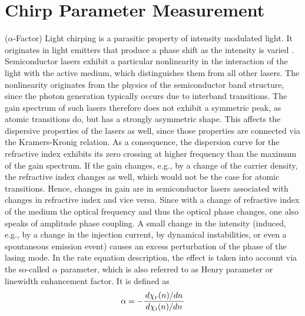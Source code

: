 \section{Chirp Parameter Measurement}\label{sec:chirp_measurement}
($\alpha$-Factor)
Light chirping is a parasitic property of intensity modulated light. It originates in light emitters that produce a phase shift as the intensity is varied \cite{devaux1993simple}. Semiconductor lasers exhibit a particular nonlinearity in the interaction of the light with the active medium, which distinguishes them from all other lasers. The nonlinearity originates from the physics of the semiconductor band structure, since the photon generation typically occurs due to interband transitions. The gain spectrum of such lasers therefore does not exhibit a symmetric peak, as atomic transitions do, but has a strongly asymmetric shape. This affects the dispersive properties of the lasers as well, since those properties are connected via the Kramers-Kronig relation. As a consequence, the dispersion curve for the refractive index exhibits its zero crossing at higher frequency than the maximum of the gain spectrum. If the gain changes, e.g., by a change of the carrier density, the refractive index changes as well, which would not be the case for atomic transitions. Hence, changes in gain are in semiconductor lasers associated with changes in refractive index and vice versa. Since with a change of refractive index of the medium the optical frequency and thus the optical phase changes, one also speaks of amplitude phase coupling. A small change in the intensity (induced, e.g., by a change in the injection current, by dynamical instabilities, or even a spontaneous emission event) causes an excess perturbation of the phase of the lasing mode. In the rate equation description, the effect is taken into account via the so-called $\alpha$ parameter, which is also referred to as Henry parameter or linewidth enhancement factor. It is defined as
\begin{equation}
    \alpha=-\frac{\dv*{\chi_r(n)}{n}}{\dv*{\chi_i(n)}{n}}
\end{equation}

